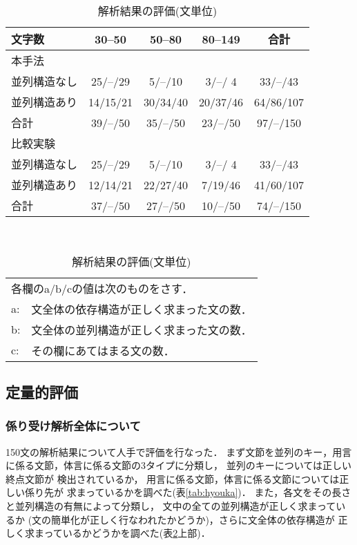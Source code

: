 \begin{table}
\caption{解析結果の評価(文単位)}
\label{tab:hyouka2}
\begin{center}
\begin{tabular}[c]{l||c|c|c||c} \hline \hline
{\small 文字数} & 30--50 & 50--80 & 80--149 & 合計 \\ \hline \hline
\multicolumn{5}{l}{本手法} \\ \hline
並列構造なし & 25/--/29 &  5/--/10 &  3/--/ 4 & 33/--/43 \\ 
並列構造あり & 14/15/21 & 30/34/40 & 20/37/46 & 64/86/107 \\ \hline
合計         & 39/--/50 & 35/--/50 & 23/--/50 & 97/--/150 \\ \hline \hline 
\multicolumn{5}{l}{比較実験} \\ \hline
並列構造なし & 25/--/29 &  5/--/10 &  3/--/ 4 & 33/--/43 \\
並列構造あり & 12/14/21 & 22/27/40 &  7/19/46 & 41/60/107 \\ \hline 
合計         & 37/--/50 & 27/--/50 & 10/--/50 & 74/--/150 \\ \hline 
\end{tabular} \\

\vspace{0.5cm}

\begin{tabular}{ll}
\multicolumn{2}{l}{各欄のa/b/cの値は次のものをさす．} \\
a: & 文全体の依存構造が正しく求まった文の数． \\
b: & 文全体の並列構造が正しく求まった文の数． \\
c: & その欄にあてはまる文の数． \\
\end{tabular}
\end{center}
\end{table}

\subsection{定量的評価}

\subsubsection*{係り受け解析全体について}

150文の解析結果について人手で評価を行なった．
まず文節を並列のキー，用言に係る文節，体言に係る文節の3タイプに分類し，
並列のキーについては正しい終点文節が
検出されているか，
用言に係る文節，体言に係る文節については正しい係り先が
求まっているかを調べた(表\ref{tab:hyouka})．
また，各文をその長さと並列構造の有無によって分類し，
文中の全ての並列構造が正しく求まっているか
(文の簡単化が正しく行なわれたかどうか)，さらに文全体の依存構造が
正しく求まっているかどうかを調べた(表\ref{tab:hyouka2}上部)．


